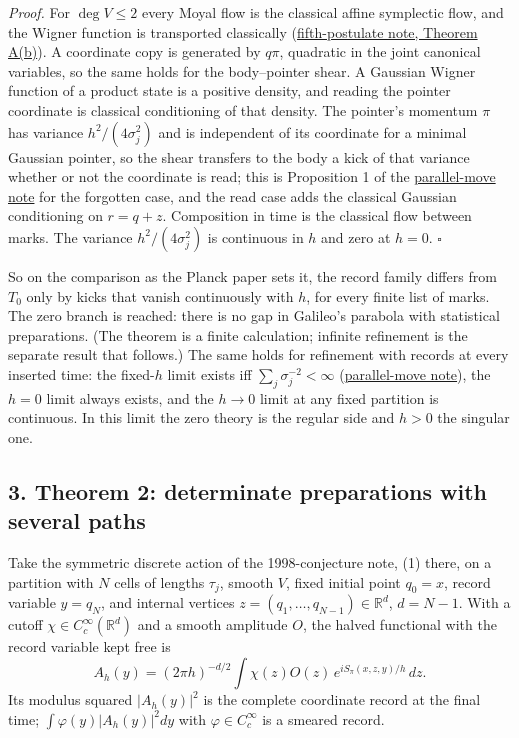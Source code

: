 \documentclass[11pt,a4paper]{article}
\begin{document}
\emph{Proof.} For \(\deg V\le2\) every Moyal flow is the classical
affine symplectic flow, and the Wigner function is transported
classically (\href{principia-fifth-postulate.md}{fifth-postulate note,
Theorem A(b)}). A coordinate copy is generated by \(q\pi\), quadratic in
the joint canonical variables, so the same holds for the body--pointer
shear. A Gaussian Wigner function of a product state is a positive
density, and reading the pointer coordinate is classical conditioning of
that density. The pointer's momentum \(\pi\) has variance
\(h^2/(4\sigma_j^2)\) and is independent of its coordinate for a minimal
Gaussian pointer, so the shear transfers to the body a kick of that
variance whether or not the coordinate is read; this is Proposition 1 of
the
\href{mark-cost-and-statistical-floor.md\#forgotten-gaussian-records-and-the-refinement-limit}{parallel-move
note} for the forgotten case, and the read case adds the classical
Gaussian conditioning on \(r=q+z\). Composition in time is the classical
flow between marks. The variance \(h^2/(4\sigma_j^2)\) is continuous in
\(h\) and zero at \(h=0\). \(\square\)

So on the comparison as the Planck paper sets it, the record family
differs from \(T_0\) only by kicks that vanish continuously with \(h\),
for every finite list of marks. The zero branch is reached: there is no
gap in Galileo's parabola with statistical preparations. (The theorem is
a finite calculation; infinite refinement is the separate result that
follows.) The same holds for refinement with records at every inserted
time: the fixed-\(h\) limit exists iff \(\sum_j\sigma_j^{-2}<\infty\)
(\href{mark-cost-and-statistical-floor.md\#forgotten-gaussian-records-and-the-refinement-limit}{parallel-move
note}), the \(h=0\) limit always exists, and the \(h\to0\) limit at any
fixed partition is continuous. In this limit the zero theory is the
regular side and \(h>0\) the singular one.

\hypertarget{theorem-2-determinate-preparations-with-several-paths}{%
\subsection{3. Theorem 2: determinate preparations with several
paths}\label{theorem-2-determinate-preparations-with-several-paths}}

Take the symmetric discrete action of the 1998-conjecture note, (1)
there, on a partition with \(N\) cells of lengths \(\tau_j\), smooth
\(V\), fixed initial point \(q_0=x\), record variable \(y=q_N\), and
internal vertices \(z=(q_1,\ldots,q_{N-1})\in\mathbb R^d\), \(d=N-1\).
With a cutoff \(\chi\in C_c^\infty(\mathbb R^d)\) and a smooth amplitude
\(O\), the halved functional with the record variable kept free is
\[A_h(y)=(2\pi h)^{-d/2}\int\chi(z)O(z)\,e^{iS_\pi(x,z,y)/h}\,dz.\tag{1}\]
Its modulus squared \(|A_h(y)|^2\) is the complete coordinate record at
the final time; \(\int\varphi(y)|A_h(y)|^2dy\) with
\(\varphi\in C_c^\infty\) is a smeared record.
\end{document}
